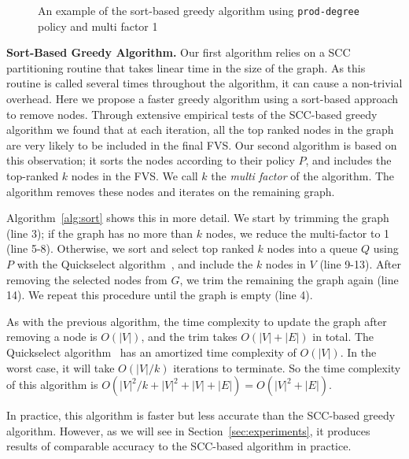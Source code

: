 \begin{figure}[t]
\begin{minipage}[b]{0.19\linewidth}
   		\end{minipage}
  	\vspace{-1em}             
   \caption{An example of the sort-based greedy algorithm using \texttt{prod-degree} policy and multi factor 1}
   \label{fig:simple}               
   \vspace{-1em}    	
\end{figure}

{\bf Sort-Based Greedy Algorithm.} Our first algorithm relies on a SCC partitioning routine that takes linear time in the size of the graph. As this routine is called several times throughout the algorithm, it can cause a non-trivial overhead. Here we propose a faster greedy algorithm using a sort-based approach to remove nodes. Through extensive empirical tests of the SCC-based greedy algorithm we found that at each iteration, all the top ranked nodes in the graph are very likely to be included in the final FVS. Our second algorithm is based on this observation; it sorts the nodes according to their policy $P$, and includes the top-ranked $k$ nodes in the FVS. We call $k$ the \emph{multi factor} of the algorithm. The algorithm removes these nodes and iterates on the remaining graph.

Algorithm~\ref{alg:sort} shows this in more detail. We start by trimming the graph (line 3); if the graph has no more than $k$ nodes, we reduce the multi-factor to 1 (line 5-8). Otherwise, we sort and select top ranked $k$ nodes into a queue $Q$ using $P$ with the Quickselect algorithm~\cite{hoare61cacm}, and include the $k$ nodes in $V$ (line 9-13).
After removing the selected nodes from $G$, we trim the remaining the graph
again (line 14). We repeat this procedure until the graph is empty (line 4). 

As with the previous algorithm, the time complexity to update the graph after removing a node is $O(|V|)$, and the trim takes $O(|V|+|E|)$ in total. The Quickselect algorithm~\cite{hoare61cacm} has an amortized time complexity of $O(|V|)$. In the worst case, it will take $O(|V|/k)$ iterations to terminate. So the time complexity of this algorithm is $O(|V|^2/k + |V|^2 + |V| + |E|)=O(|V|^2+|E|)$.

In practice, this algorithm is faster but less accurate than the SCC-based greedy algorithm. However, as we will see in Section~\ref{sec:experiments}, it produces results of comparable accuracy to the SCC-based algorithm in practice.

